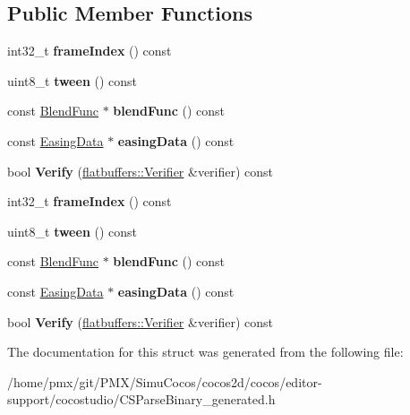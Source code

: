 \subsection*{Public Member Functions}
\begin{DoxyCompactItemize}
\item 
\mbox{\label{structflatbuffers_1_1BlendFrame_a1e81748e5dc5baa5d69a64134aafb0a6}} 
int32\+\_\+t {\bfseries frame\+Index} () const
\item 
\mbox{\label{structflatbuffers_1_1BlendFrame_a9abb2c87a0ac379eb295fb99c5ea2388}} 
uint8\+\_\+t {\bfseries tween} () const
\item 
\mbox{\label{structflatbuffers_1_1BlendFrame_aaa2da43224051af3f15665b6dd423b3a}} 
const \hyperlink{structBlendFunc}{Blend\+Func} $\ast$ {\bfseries blend\+Func} () const
\item 
\mbox{\label{structflatbuffers_1_1BlendFrame_a7550538e7e40f866d8b8a2dbd3d73ff7}} 
const \hyperlink{structflatbuffers_1_1EasingData}{Easing\+Data} $\ast$ {\bfseries easing\+Data} () const
\item 
\mbox{\label{structflatbuffers_1_1BlendFrame_a90630c3cc00f3497cfea61256beae240}} 
bool {\bfseries Verify} (\hyperlink{classflatbuffers_1_1Verifier}{flatbuffers\+::\+Verifier} \&verifier) const
\item 
\mbox{\label{structflatbuffers_1_1BlendFrame_a1e81748e5dc5baa5d69a64134aafb0a6}} 
int32\+\_\+t {\bfseries frame\+Index} () const
\item 
\mbox{\label{structflatbuffers_1_1BlendFrame_a9abb2c87a0ac379eb295fb99c5ea2388}} 
uint8\+\_\+t {\bfseries tween} () const
\item 
\mbox{\label{structflatbuffers_1_1BlendFrame_aaa2da43224051af3f15665b6dd423b3a}} 
const \hyperlink{structBlendFunc}{Blend\+Func} $\ast$ {\bfseries blend\+Func} () const
\item 
\mbox{\label{structflatbuffers_1_1BlendFrame_a7550538e7e40f866d8b8a2dbd3d73ff7}} 
const \hyperlink{structflatbuffers_1_1EasingData}{Easing\+Data} $\ast$ {\bfseries easing\+Data} () const
\item 
\mbox{\label{structflatbuffers_1_1BlendFrame_a90630c3cc00f3497cfea61256beae240}} 
bool {\bfseries Verify} (\hyperlink{classflatbuffers_1_1Verifier}{flatbuffers\+::\+Verifier} \&verifier) const
\end{DoxyCompactItemize}


The documentation for this struct was generated from the following file\+:\begin{DoxyCompactItemize}
\item 
/home/pmx/git/\+P\+M\+X/\+Simu\+Cocos/cocos2d/cocos/editor-\/support/cocostudio/C\+S\+Parse\+Binary\+\_\+generated.\+h\end{DoxyCompactItemize}
